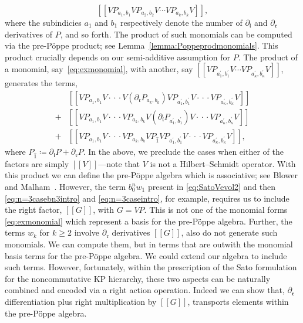 \documentclass[5p,twocolumn]{elsarticle}
\newcommand*{\pa}{{\partial}}
\newcommand*{\lb}{[\![}
\newcommand*{\rb}{]\!]}
\newcommand*{\el}{\mathfrak l}
\newcommand*{\rl}{\mathfrak r}
\begin{document}
\begin{equation}\label{eq:exmonomial}
\lb VP_{a_1,b_1}VP_{a_2,b_2}V\cdots VP_{a_k,b_k}V\rb,
\end{equation}
where the subindicies $a_1$ and $b_1$ respectively denote the number of $\pa_{\el}$ and $\pa_{\rl}$ derivatives of $P$, and so forth.
The product of such monomials can be computed via the pre-P\"oppe product; see Lemma~\ref{lemma:Poppeprodmonomials}.
This product crucially depends on our semi-additive assumption for $P$.
The product of a monomial, say~\eqref{eq:exmonomial}, with another, say $\lb VP_{a_1^\prime,b_1^\prime}V\cdots VP_{a_\kappa^\prime,b_\kappa^\prime}V\rb$, 
generates the terms,
\begin{align}
   &\lb VP_{a_1,b_1}V\cdot\!\cdot\!\cdot V(\pa_{\rl}P_{a_k,b_k})VP_{a_1^\prime,b_1^\prime}V\cdot\!\cdot\!\cdot VP_{a_\kappa^\prime,b_\kappa^\prime}V\rb\nonumber\\
  +&\lb VP_{a_1,b_1}V\cdot\!\cdot\!\cdot VP_{a_k,b_k}V(\pa_{\el}P_{a_1^\prime,b_1^\prime})V\cdot\!\cdot\!\cdot VP_{a_\kappa^\prime,b_\kappa^\prime}V\rb\nonumber\\
  +&\lb VP_{a_1,b_1}V\cdot\!\cdot\!\cdot VP_{a_k,b_k}VP_{\hat{1}}VP_{a_1^\prime,b_1^\prime}V\cdot\!\cdot\!\cdot VP_{a_\kappa^\prime,b_\kappa^\prime}V\rb,\label{eq:Poppeprodintro}
\end{align}
where $P_{\hat{1}}\coloneqq \pa_{\el}P+\pa_{\rl}P$.
In the above, we preclude the cases when either of the factors are simply $\lb V\rb$---note that $V$ is not a Hilbert--Schmidt operator. 
With this product we can define the pre-P\"oppe algebra which is associative; see Blower and Malham~\cite{BM-KP}.
However, the term $b_0^nw_1$ present in \eqref{eq:SatoVevol2} and then \eqref{eq:n=3casebn3intro} and \eqref{eq:n=3caseintro}, for example, requires us to include the right factor, $\lb G\rb$, with $G=VP$.
This is not one of the monomial forms \eqref{eq:exmonomial} which represent a basis for the pre-P\"oppe algebra.
Further, the terms $w_k$ for $k\geqslant2$ involve $\pa_{\rl}$ derivatives $\lb G\rb$, also do not generate such monomials. 
We can compute them, but in terms that are outwith the monomial basis terms for the pre-P\"oppe algebra. 
We could extend our algebra to include such terms.
However, fortunately, within the prescription of the Sato formulation for the noncommutative KP hierarchy, these two aspects can be naturally combined and encoded via a right action operation.
Indeed we can show that, $\pa_{\rl}$ differentiation plus right multiplication by $\lb G\rb$, transports elements within the pre-P\"oppe algebra.
\end{document}
